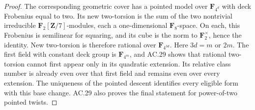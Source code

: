 \begin{proof}
The corresponding geometric cover has a pointed model over
$\mathbf F_{4^d}$ with deck Frobenius equal to two.
Its new two-torsion is the sum of the two nontrivial irreducible
$\mathbf F_2[\mathbf Z/7]$-modules, each a one-dimensional
$\mathbf F_8$-space. On each, this Frobenius is semilinear for
squaring, and its cube is the norm to $\mathbf F_2^\times$,
hence the identity. New two-torsion is therefore rational over
$\mathbf F_{4^{3d}}$.
Here $3d=m$ or $2m$. The first field with constant deck group is
$\mathbf F_{4^m}$, and AC.29 shows that rational two-torsion cannot
first appear only in its quadratic extension.
Its relative class number is already even over that first field
and remains even over every extension.
The uniqueness of the pointed descent identifies every eligible
form with this base change. AC.29 also proves the final statement
for power-of-two pointed twists.
\end{proof}


